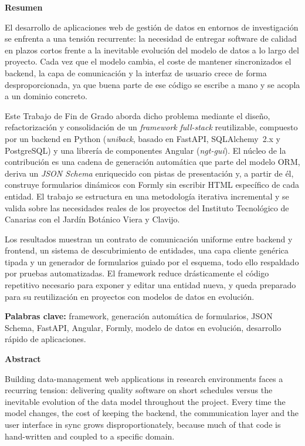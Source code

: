 {\setlength{\parskip}{4mm}
{\huge{\textbf{Resumen}}}

El desarrollo de aplicaciones web de gestión de datos en entornos de
investigación se enfrenta a una tensión recurrente: la necesidad de entregar
software de calidad en plazos cortos frente a la inevitable evolución del
modelo de datos a lo largo del proyecto. Cada vez que el modelo cambia, el
coste de mantener sincronizados el backend, la capa de comunicación y la
interfaz de usuario crece de forma desproporcionada, ya que buena parte de ese
código se escribe a mano y se acopla a un dominio concreto.

Este Trabajo de Fin de Grado aborda dicho problema mediante el diseño,
refactorización y consolidación de un \emph{framework} \emph{full-stack}
reutilizable, compuesto por un backend en Python (\emph{uniback}, basado en
FastAPI, SQLAlchemy~2.x y PostgreSQL) y una librería de componentes Angular
(\emph{ngt-gui}). El núcleo de la contribución es una cadena de generación
automática que parte del modelo ORM, deriva un \emph{JSON Schema} enriquecido
con pistas de presentación y, a partir de él, construye formularios dinámicos
con Formly sin escribir HTML específico de cada entidad. El trabajo se
estructura en una metodología iterativa incremental y se valida sobre las
necesidades reales de los proyectos del Instituto Tecnológico de Canarias con
el Jardín Botánico Viera y Clavijo.

Los resultados muestran un contrato de comunicación uniforme entre backend y
frontend, un sistema de descubrimiento de entidades, una capa cliente
genérica tipada y un generador de formularios guiado por el esquema, todo ello
respaldado por pruebas automatizadas. El framework reduce drásticamente el
código repetitivo necesario para exponer y editar una entidad nueva, y queda
preparado para su reutilización en proyectos con modelos de datos en
evolución.

\textbf{Palabras clave:} framework, generación automática de formularios,
JSON Schema, FastAPI, Angular, Formly, modelo de datos en evolución, desarrollo
rápido de aplicaciones.

\newpage

{\huge{\textbf{Abstract}}}

Building data-management web applications in research environments faces a
recurring tension: delivering quality software on short schedules versus the
inevitable evolution of the data model throughout the project. Every time the
model changes, the cost of keeping the backend, the communication layer and
the user interface in sync grows disproportionately, because much of that code
is hand-written and coupled to a specific domain.

}
